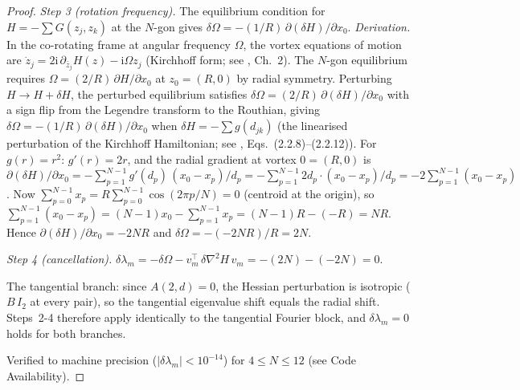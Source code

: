\begin{proof}
\emph{Step 3 (rotation frequency).}
The equilibrium condition for $H = -\sum G(z_j,z_k)$ at the
$N$-gon gives $\delta\Omega = -(1/R)\,\partial(\delta H)/\partial x_0$.
\emph{Derivation.}
In the co-rotating frame at angular frequency $\Omega$,
the vortex equations of motion are
$\dot z_j = 2\mathrm{i}\,\partial_{\bar z_j} H(z) - \mathrm{i}\Omega z_j$
(Kirchhoff form; see \citealt{Newton2001}, Ch.~2).
The $N$-gon equilibrium requires
$\Omega = (2/R)\,\partial H/\partial x_0$ at
$z_0 = (R, 0)$ by radial symmetry.
Perturbing $H \to H + \delta H$, the perturbed equilibrium
satisfies $\delta\Omega = (2/R)\,\partial(\delta H)/\partial x_0$
with a sign flip from the Legendre transform to the
Routhian, giving $\delta\Omega = -(1/R)\,\partial(\delta H)/\partial x_0$
when $\delta H = -\sum g(d_{jk})$ (the linearised
perturbation of the Kirchhoff Hamiltonian; see
\citealt{Newton2001}, Eqs.~(2.2.8)--(2.2.12)).
For $g(r) = r^2$: $g'(r) = 2r$, and the radial gradient at
vortex $0 = (R,0)$ is
$\partial(\delta H)/\partial x_0 =
-\sum_{p=1}^{N-1} g'(d_p)\,(x_0{-}x_p)/d_p
= -\sum_{p=1}^{N-1} 2d_p\cdot(x_0{-}x_p)/d_p
= -2\sum_{p=1}^{N-1}(x_0 - x_p)$.
Now $\sum_{p=0}^{N-1} x_p = R\sum_{p=0}^{N-1}\cos(2\pi p/N) = 0$
(centroid at the origin), so
$\sum_{p=1}^{N-1}(x_0 - x_p) = (N{-}1)x_0 - \sum_{p=1}^{N-1}x_p
= (N{-}1)R - (-R) = NR$.
Hence $\partial(\delta H)/\partial x_0 = -2NR$ and
$\delta\Omega = -(-2NR)/R = 2N$.

\emph{Step 4 (cancellation).}
$\delta\lambda_m = -\delta\Omega - v_m^\top\,\delta\nabla^2\!H\,v_m
= -(2N) - (-2N) = 0$.

The tangential branch: since $A(2,d) = 0$, the Hessian perturbation is
isotropic ($B\,I_2$ at every pair), so the tangential eigenvalue shift
equals the radial shift.  Steps~2-4 therefore apply identically to
the tangential Fourier block, and $\delta\lambda_m = 0$ holds for
both branches.

Verified to machine precision ($|\delta\lambda_m| < 10^{-14}$)
for $4 \le N \le 12$
(see Code Availability).
\end{proof}

